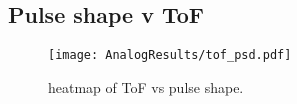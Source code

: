 \documentclass[main.tex]{subfiles}
\begin{document}
\subsection{Pulse shape v ToF}
\begin{figure}[ht]
    \centering
        \texttt{[image: AnalogResults/tof\_psd.pdf]}
        \caption{heatmap of ToF vs pulse shape.}
    \label{fig:tof_ps_a} 
\end{figure}
\end{document}
